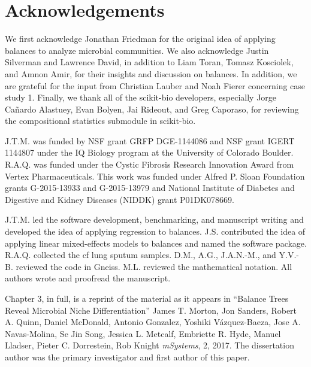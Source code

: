 \section{Acknowledgements}
We first acknowledge Jonathan Friedman for the original idea of applying balances to analyze microbial communities. We also acknowledge Justin Silverman and Lawrence David, in addition to Liam Toran, Tomasz Kosciolek, and Amnon Amir, for their insights and discussion on balances. In addition, we are grateful for the input from Christian Lauber and Noah Fierer concerning case study 1. Finally, we thank all of the scikit-bio developers, especially Jorge Cañardo Alastuey, Evan Bolyen, Jai Rideout, and Greg Caporaso, for reviewing the compositional statistics submodule in scikit-bio.

J.T.M. was funded by NSF grant GRFP DGE-1144086 and NSF grant IGERT 1144807 under the IQ Biology program at the University of Colorado Boulder. R.A.Q. was funded under the Cystic Fibrosis Research Innovation Award from Vertex Pharmaceuticals. This work was funded under Alfred P. Sloan Foundation grants G-2015-13933 and G-2015-13979 and National Institute of Diabetes and Digestive and Kidney Diseases (NIDDK) grant P01DK078669.

J.T.M. led the software development, benchmarking, and manuscript writing and developed the idea of applying regression to balances. J.S. contributed the idea of applying linear mixed-effects models to balances and named the software package. R.A.Q. collected the \gls{cf} lung sputum samples. D.M., A.G., J.A.N.-M., and Y.V.-B. reviewed the code in Gneiss. M.L. reviewed the mathematical notation. All authors wrote and proofread the manuscript.

Chapter 3, in full, is a reprint of the material as it appears in
``Balance Trees Reveal Microbial Niche Differentiation''
James T. Morton, Jon Sanders, Robert A. Quinn, Daniel McDonald, Antonio Gonzalez,
Yoshiki Vázquez-Baeza, Jose A. Navas-Molina, Se Jin Song, Jessica L. Metcalf,
Embriette R. Hyde, Manuel Lladser, Pieter C. Dorrestein, Rob Knight
\emph{mSystems}, 2, 2017.  The dissertation author was the primary investigator and first author of this paper.

